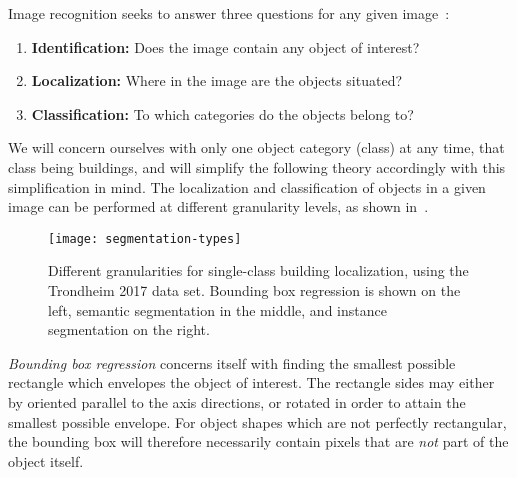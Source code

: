 Image recognition seeks to answer three questions for any given image~\cite[p.~1]{image_recognition}:

\begin{enumerate}[nosep]
  \item \textbf{Identification:} Does the image contain any object of interest?
  \item \textbf{Localization:} Where in the image are the objects situated?
  \item \textbf{Classification:} To which categories do the objects belong to?
\end{enumerate}

We will concern ourselves with only one object category (class) at any time, that class being buildings, and will simplify the following theory accordingly with this simplification in mind.
The localization and classification of objects in a given image can be performed at different granularity levels, as shown in~.

\begin{figure}[htb]
  \texttt{[image: segmentation-types]}
  \caption{
    Different granularities for single-class building localization, using the Trondheim 2017 data set.
    Bounding box regression is shown on the left, semantic segmentation in the middle, and instance segmentation on the right.
  }%
  \label{fig:segmentation-types}
\end{figure}
\newpage

\textit{Bounding box regression} concerns itself with finding the smallest possible rectangle which envelopes the object of interest.
The rectangle sides may either by oriented parallel to the axis directions, or rotated in order to attain the smallest possible envelope.
For object shapes which are not perfectly rectangular, the bounding box will therefore necessarily contain pixels that are \textit{not} part of the object itself.

